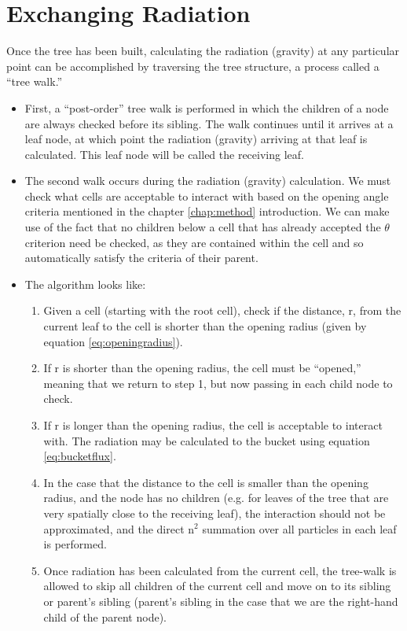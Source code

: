 \section{Exchanging Radiation}
\label{sec:exchangerad}
Once the tree has been built, calculating the radiation (gravity) at any particular point can be accomplished by traversing the tree structure, a process called a ``tree walk.''

\begin{itemize}
\item First, a ``post-order'' tree walk is performed in which the children of a node are always checked before its sibling. The walk continues until it arrives at a leaf node, at which point the radiation (gravity) arriving at that leaf is calculated. This leaf node will be called the receiving leaf.
\item The second walk occurs during the radiation (gravity) calculation. We must check what cells are acceptable to interact with based on the opening angle criteria mentioned in the chapter \ref{chap:method} introduction. We can make use of the fact that no children below a cell that has already accepted the $\theta$ criterion need be checked, as they are contained within the cell and so automatically satisfy the criteria of their parent.
\item The algorithm looks like:
	\begin{enumerate}
	\item Given a cell (starting with the root cell), check if the distance, r, from the current leaf to the cell is shorter than the opening radius (given by equation \ref{eq:openingradius}).
	\item If r is shorter than the opening radius, the cell must be ``opened,'' meaning that we return to step 1, but now passing in each child node to check.
	\item If r is longer than the opening radius, the cell is acceptable to interact with. The radiation may be calculated to the bucket using equation \ref{eq:bucketflux}.
	\item In the case that the distance to the cell is smaller than the opening radius, and the node has no children (e.g. for leaves of the tree that are very spatially close to the receiving leaf), the interaction should not be approximated, and the direct n$^2$ summation over all particles in each leaf is performed.
	\item Once radiation has been calculated from the current cell, the tree-walk is allowed to skip all children of the current cell and move on to its sibling or parent's sibling (parent's sibling in the case that we are the right-hand child of the parent node). 

\end{enumerate}
\end{itemize}
